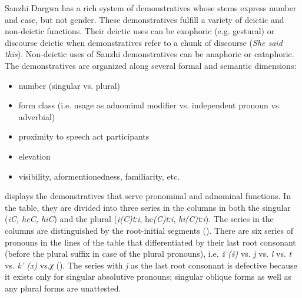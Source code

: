 Sanzhi Dargwa has a rich system of demonstratives whose stems express number and case, but not gender. These demonstratives fulfill a variety of deictic and non-deictic functions. Their deictic uses can be exophoric (e.g. gestural) or discourse deictic when demonstratives refer to a chunk of discourse (\textit{She said this}). Non-deictic uses of Sanzhi demonstratives can be anaphoric or cataphoric. The demonstratives are organized along several formal and semantic dimensions:
%
\pagebreak
\begin{itemize}
	\item	number (singular vs. plural)
	\item	form class (i.e. usage as adnominal modifier vs. independent pronoun vs. adverbial) 
	\item	proximity to speech act participants
	\item	elevation
	\item	visibility, aformentionedness, familiarity, etc.
\end{itemize}
%
 displays the demonstratives that serve pronominal and adnominal functions. In the table, they are divided into three series in the columns in both the singular (\textit{iC, heC, hiC}) and the plural (\textit{i(C)tːi}, he\textit{(C)tːi}, \textit{hi(C)tːi}). The series in the columns are distinguished by the root-initial segments (). There are six series of pronouns in the lines of the table that differentiated by their last root consonant (before the plural suffix in case of the plural pronouns), i.e. \textit{ž (š)} vs. \textit{j} vs. \textit{l} vs. \textit{t} vs. \textit{k' (x)} vs.\textit{χ} (). The series with \textit{j} as the last root consonant is defective because it exists only for singular absolutive pronouns; singular oblique forms as well as any plural forms are unattested.


